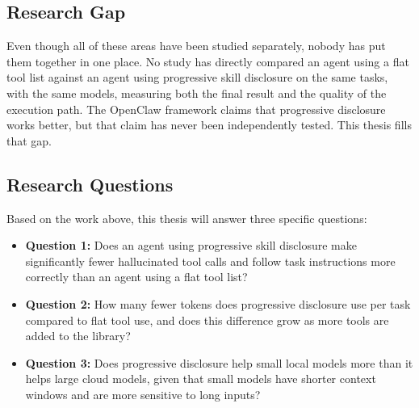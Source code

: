 \subsection{Research Gap}

Even though all of these areas have been studied separately, nobody has put them together in one place. No study has directly compared an agent using a flat tool list against an agent using progressive skill disclosure on the same tasks, with the same models, measuring both the final result and the quality of the execution path. The OpenClaw framework claims that progressive disclosure works better, but that claim has never been independently tested. This thesis fills that gap.

\subsection{Research Questions}

Based on the work above, this thesis will answer three specific questions:

\begin{itemize}
    \item \textbf{Question 1:} Does an agent using progressive skill disclosure make significantly fewer hallucinated tool calls and follow task instructions more correctly than an agent using a flat tool list?
    \item \textbf{Question 2:} How many fewer tokens does progressive disclosure use per task compared to flat tool use, and does this difference grow as more tools are added to the library?
    \item \textbf{Question 3:} Does progressive disclosure help small local models more than it helps large cloud models, given that small models have shorter context windows and are more sensitive to long inputs?
\end{itemize}
